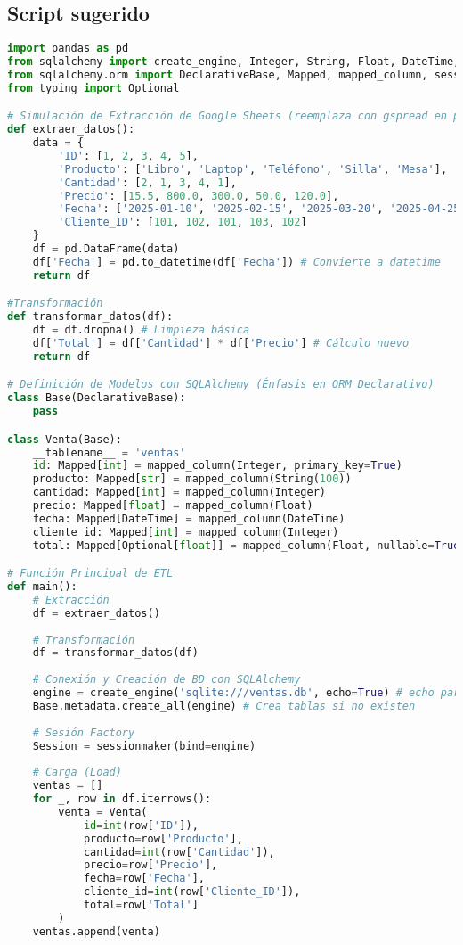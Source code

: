 \documentclass[12pt,a4paper]{article}
\begin{document}
\subsection*{Script sugerido}
\begin{lstlisting}[language=Python, caption={ETL con SQLAlchemy}]
import pandas as pd
from sqlalchemy import create_engine, Integer, String, Float, DateTime, func
from sqlalchemy.orm import DeclarativeBase, Mapped, mapped_column, sessionmaker
from typing import Optional

# Simulación de Extracción de Google Sheets (reemplaza con gspread en producción)
def extraer_datos():
    data = {
        'ID': [1, 2, 3, 4, 5],
        'Producto': ['Libro', 'Laptop', 'Teléfono', 'Silla', 'Mesa'],
        'Cantidad': [2, 1, 3, 4, 1],
        'Precio': [15.5, 800.0, 300.0, 50.0, 120.0],
        'Fecha': ['2025-01-10', '2025-02-15', '2025-03-20', '2025-04-25', '2025-05-30'],
        'Cliente_ID': [101, 102, 101, 103, 102]
    }
    df = pd.DataFrame(data)
    df['Fecha'] = pd.to_datetime(df['Fecha']) # Convierte a datetime
    return df

#Transformación
def transformar_datos(df):
    df = df.dropna() # Limpieza básica
    df['Total'] = df['Cantidad'] * df['Precio'] # Cálculo nuevo
    return df

# Definición de Modelos con SQLAlchemy (Énfasis en ORM Declarativo)
class Base(DeclarativeBase):
    pass

class Venta(Base):
    __tablename__ = 'ventas'
    id: Mapped[int] = mapped_column(Integer, primary_key=True)
    producto: Mapped[str] = mapped_column(String(100))
    cantidad: Mapped[int] = mapped_column(Integer)
    precio: Mapped[float] = mapped_column(Float)
    fecha: Mapped[DateTime] = mapped_column(DateTime)
    cliente_id: Mapped[int] = mapped_column(Integer)
    total: Mapped[Optional[float]] = mapped_column(Float, nullable=True)

# Función Principal de ETL
def main():
    # Extracción
    df = extraer_datos()
	
    # Transformación
    df = transformar_datos(df)
	
    # Conexión y Creación de BD con SQLAlchemy
    engine = create_engine('sqlite:///ventas.db', echo=True) # echo para logging
    Base.metadata.create_all(engine) # Crea tablas si no existen
    
    # Sesión Factory
    Session = sessionmaker(bind=engine)
    
    # Carga (Load)
    ventas = []
    for _, row in df.iterrows():
        venta = Venta(
            id=int(row['ID']),
            producto=row['Producto'],
            cantidad=int(row['Cantidad']),
            precio=row['Precio'],
            fecha=row['Fecha'],
            cliente_id=int(row['Cliente_ID']),
            total=row['Total']
        )    
    ventas.append(venta)
    

\end{lstlisting}
\end{document}
